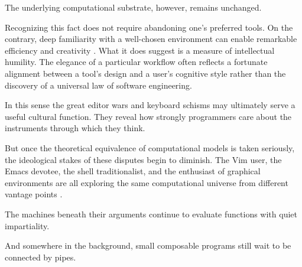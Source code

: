 \documentclass[12pt]{article}
\theoremstyle{definition}
\begin{document}
The underlying computational substrate, however, remains unchanged.

Recognizing this fact does not require abandoning one's preferred tools.
On the contrary, deep familiarity with a well-chosen environment can
enable remarkable efficiency and creativity \cite{knuth1984}. What it
does suggest is a measure of intellectual humility. The elegance of a
particular workflow often reflects a fortunate alignment between a
tool's design and a user's cognitive style rather than the discovery of
a universal law of software engineering.

In this sense the great editor wars and keyboard schisms may ultimately
serve a useful cultural function. They reveal how strongly programmers
care about the instruments through which they think.

But once the theoretical equivalence of computational models is taken
seriously, the ideological stakes of these disputes begin to diminish.
The Vim user, the Emacs devotee, the shell traditionalist, and the
enthusiast of graphical environments are all exploring the same
computational universe from different vantage points \cite{raymond2003}.

The machines beneath their arguments continue to evaluate functions with
quiet impartiality.

And somewhere in the background, small composable programs still wait to
be connected by pipes.
\end{document}
